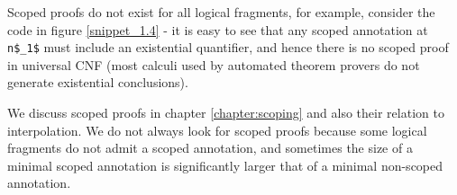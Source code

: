 Scoped proofs do not exist for all logical fragments, for example, consider the code in figure \ref{snippet_1.4} - it is easy to see that any scoped annotation at \lstinline|n$_1$| must include an existential quantifier, and hence there is no scoped proof in universal CNF (most calculi used by automated theorem provers do not generate existential conclusions).

We discuss scoped proofs in chapter \ref{chapter:scoping} and also their relation to interpolation. We do not always look for scoped proofs because some logical fragments do not admit a scoped annotation, and sometimes the size of a minimal scoped annotation is significantly larger that of a minimal non-scoped annotation.

